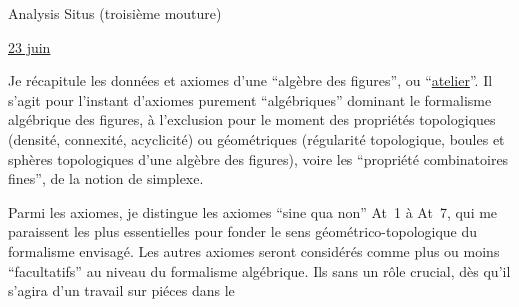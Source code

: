 \begin{center}Analysis Situs (troisième mouture)\end{center}

\uline{23 juin}

Je récapitule les données et axiomes d'une ``algèbre des figures'', ou ``\uline{atelier}''. \margin{--}Il s'agit pour l'instant d'axiomes purement ``algébriques'' dominant le formalisme algébrique des figures, à l'exclusion pour le moment des propriétés topologiques (densité, connexité, acyclicité) ou  géométriques (régularité topologique, boules et sphères topologiques d'une algèbre des figures), voire les ``propriété combinatoires fines'',  de la notion de simplexe.

Parmi les axiomes, je distingue les axiomes ``sine qua non'' At~1 à At~7, qui me paraissent les plus essentielles pour fonder le sens géométrico-topologique du formalisme envisagé. Les autres axiomes seront considérés comme plus ou moins ``facultatifs'' au niveau du formalisme algébrique. Ils  sans  un rôle crucial, dès qu'il s'agira d'un travail sur piéces dans le
